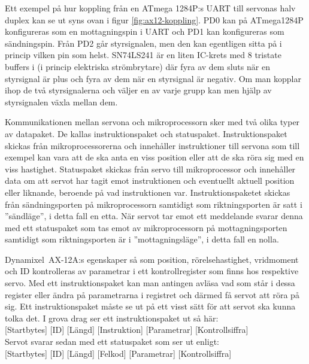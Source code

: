 \documentclass[a4paper,12pt]{article}
\begin{document}
Ett exempel på hur koppling från en ATmega 1284P:s UART till servonas halv duplex kan se ut syns ovan i figur \ref{fig:ax12-koppling}. PD0 kan på ATmega1284P konfigureras som en mottagningspin i UART och PD1 kan konfigureras som sändningspin. Från PD2 går styrsignalen, men den kan egentligen sitta på i princip vilken pin som helst. SN74LS241 är en liten IC-krets med 8 tristate buffers i (i princip elektriska strömbrytare) där fyra av dem sluts när en styrsignal är plus och fyra av dem när en styrsignal är negativ. Om man kopplar ihop de två styrsignalerna och väljer en av varje grupp kan men hjälp av styrsignalen växla mellan dem.\cite{dyn-manual}
 
Kommunikationen mellan servona och mikroprocessorn sker med två olika typer av datapaket. De kallas instruktionspaket och statuspaket. Instruktionspaket skickas från mikroprocessorerna och innehåller instruktioner till servona som till exempel kan vara att de ska anta en viss position eller att de ska röra sig med en viss hastighet. Statuspaket skickas från servo till mikroprocessor och innehåller data om att servot har tagit emot instruktionen och eventuellt aktuell position eller liknande, beroende på vad instruktionen var. Instruktionspaketet skickas från sändningsporten på mikroprocessorn samtidigt som riktningsporten är satt i ''sändläge'', i detta fall en etta. När servot tar emot ett meddelande svarar denna med ett statuspaket som tas emot av mikroprocessorn på mottagningsporten samtidigt som riktningsporten är i ''mottagningsläge'', i detta fall en nolla. 

Dynamixel~AX-12A:s egenskaper så som position, rörelsehastighet, vridmoment och ID kontrolleras av parametrar i ett kontrollregister som finns hos respektive servo. Med ett instruktionspaket kan man antingen avläsa vad som står i dessa register eller ändra på parametrarna i registret och därmed få servot att röra på sig. Ett instruktionspaket måste se ut på ett visst sätt för att servot ska kunna tolka det. I grova drag ser ett instruktionspaket ut så här:\\

[Startbytes] [ID] [Längd] [Instruktion] [Parametrar] [Kontrollsiffra]\\

Servot svarar sedan med ett statuspaket som ser ut enligt:\\

[Startbytes] [ID] [Längd] [Felkod] [Parametrar] [Kontrollsiffra]\\
\end{document}
